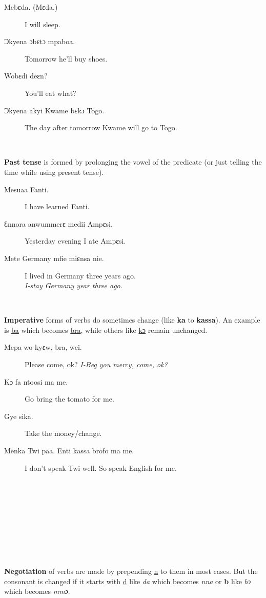 \documentclass[%
 fontsize=11pt,%
 a5paper,pagesize,
 paper=a5,%
 DIV=9,%
 parskip=half*,%
 twoside=true,
 pointlessnumbers
]{scrbook}%
\begin{document}
\begin{description}
  \item[Mebɛda. (Mɛda.)] I will sleep.
  \item[Ɔkyena ɔbɛtɔ mpaboa.] Tomorrow he'll buy shoes.
  \item[Wobɛdi deɛn?] You'll eat what?
  \item[Ɔkyena akyi Kwame bɛkɔ Togo.] The day after tomorrow Kwame will go to Togo.
\end{description}



~


\textbf{Past tense} is formed by prolonging the vowel of the predicate (or just telling the time while using present tense).

\begin{description}
  \item[Mesuaa Fanti.] I have learned Fanti.
  \item[Ɛnnora anwummerɛ medii Ampɛsi.] Yesterday evening I ate Ampɛsi.
  \item[Mete Germany mfie miɛnsa nie.] I lived in Germany three years ago. \\
    \textit{I-stay Germany year three ago.}
\end{description}


~


\textbf{Imperative} forms of verbs do sometimes change (like \textbf{ka} to \textbf{kassa}). An example is \underline{ba} which becomes \underline{bra}, while others like \underline{kɔ} remain unchanged.

\begin{description}
  \item[Mepa wo kyɛw, bra, wei.] Please come, ok?
    \textit{I-Beg you mercy, come, ok?}
  \item[Kɔ fa ntoosi ma me.] Go bring the tomato for me.
  \item[Gye sika.] Take the money/change.
  \item[Menka Twi paa. Enti kassa brofo ma me.] I don't speak Twi well. So speak English for me.
\end{description}


~


~


~


~


~


\textbf{Negotiation} of verbs are made by prepending \underline{n} to them in most cases. But the consonant is changed if it starts with \underline{d} like \textit{da} which becomes \textit{nna} or \textbf{b} like \textit{bɔ} which becomes \textit{mmɔ}.
\end{document}
